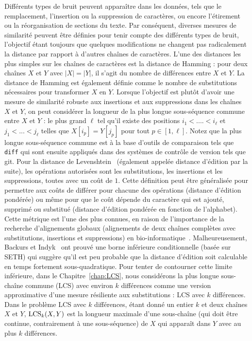 Différents types de bruit peuvent apparaître dans les données, tels que le remplacement, l'insertion ou la suppression de caractères, ou encore l'étirement ou la réorganisation de sections du texte. Par conséquent, diverses mesures de similarité peuvent être définies pour tenir compte des différents types de bruit, l'objectif étant toujours que quelques modifications ne changent pas radicalement la distance par rapport à d'autres chaînes de caractères.
L'une des distances les plus simples sur les chaînes de caractères est la distance de Hamming : pour deux chaînes $X$ et $Y$ avec $|X|=|Y|$, il s'agit du nombre de différences entre $X$ et $Y$. La distance de Hamming est également définie comme le nombre de substitutions nécessaires pour transformer $X$ en $Y$.
Lorsque l'objectif est plutôt d'avoir une mesure de similarité robuste aux insertions et aux suppressions dans les chaînes $X$ et $Y$, on peut considérer la longueur de la plus longue sous-séquence commune entre $X$ et $Y$ : le plus grand $\ell$ tel qu'il existe des positions $i_1<.... < i_\ell$ et $j_1< ... < j_\ell$ telles que $X[i_p] = Y[j_p]$ pour tout $p \in [1,\ell]$. Notez que la plus longue sous-séquence commune est à la base d'outils de comparaison tels que \texttt{diff} qui sont ensuite appliqués dans des systèmes de contrôle de version tels que git.
Pour la distance de Levenshtein~\cite{levenshtein1966binary} (également appelée distance d'édition par la suite), les opérations autorisées sont les substitutions, les insertions et les suppressions, toutes avec un coût de $1$. Cette définition peut être généralisée pour permettre aux coûts de différer pour chacune des opérations (distance d'édition pondérée) ou même pour que le coût dépende du caractère qui est ajouté, supprimé ou substitué (distance d'édition pondérée en fonction de l'alphabet). Cette métrique est l'une des plus connues, en raison de l'importance de la recherche d'alignements globaux (alignements de deux chaînes complètes avec substitutions, insertions et suppressions) en bio-informatique~\cite{Gusfield1997}.
Malheureusement, Backurs et Indyk~\cite{DBLP:conf/stoc/BackursI15} ont prouvé une borne inférieure conditionnelle (basée sur SETH) qui suggère qu'il est peu probable que la distance d'édition soit calculable en temps fortement sous-quadratique.
Pour tenter de contourner cette limite inférieure, dans le Chapitre~\ref{chap:LCS}, nous considérons la plus longue sous-chaîne  commune (LCS) avec environ $k$ différences comme une version approximative d'une mesure résiliente aux substitutions : LCS avec $k$ différences. Dans le problème LCS avec $k$ différences, étant donné un entier $k$ et deux chaînes $X$ et $Y$, $\mathrm{LCS}_{k}(X,Y)$ est la longueur maximale d'une sous-chaîne (qui doit être continue, contrairement à une sous-séquence) de $X$ qui apparaît dans $Y$ avec au plus $k$ différences. 
